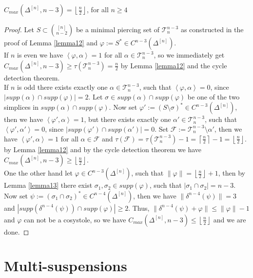 \begin{thm}
\(C_{max}(\Delta^{[n]},n-3)=\left\lfloor\frac{n}{2}\right\rfloor\), for all \(n\geq 4\)
\begin{proof}
Let \(S\subset\binom{[n]}{n-2}\) be a minimal piercing set of \(\mathcal{T}_n^{n-3}\) as constructed in the proof of Lemma \ref{lemma12} and \(\varphi:=S^*\in C^{n-3}(\Delta^{[n]})\).\\
If \(n\) is even we have \(\left\langle\varphi,\alpha\right\rangle=1\) for all \(\alpha\in\mathcal{T}_n^{n-3}\), so we immediately get \(C_{max}(\Delta^{[n]},n-3)\geq\tau(\mathcal{T}_n^{n-3})=\frac{n}{2}\) by Lemma \ref{lemma12} and the cycle detection theorem.\\
If \(n\) is odd there exists exactly one \(\alpha\in\mathcal{T}_n^{n-3}\), such that \(\left\langle\varphi,\alpha\right\rangle=0\), since \(\left|supp(\alpha)\cap supp(\varphi)\right|=2\). Let \(\sigma\in supp(\alpha)\cap supp(\varphi)\) be one of the two simplices in \(supp(\alpha)\cap supp(\varphi)\). Now set \(\varphi':=(S\setminus\sigma)^*\in C^{n-3}(\Delta^{[n]})\), then we have \(\left\langle\varphi',\alpha\right\rangle=1\), but there exists exactly one \(\alpha'\in\mathcal{T}_n^{n-3}\), such that \(\left\langle\varphi',\alpha'\right\rangle=0\), since \(\left|supp(\varphi')\cap supp(\alpha')\right|=0\). Set \(\mathcal{F}:=\mathcal{T}_n^{n-3}\setminus\alpha'\), then we have \(\left\langle\varphi',\alpha\right\rangle=1\) for all \(\alpha\in\mathcal{F}\) and \(\tau(\mathcal{F})=\tau(\mathcal{T}_n^{n-3})-1=\left\lceil\frac{n}{2}\right\rceil-1=\left\lfloor\frac{n}{2}\right\rfloor\). by Lemma \ref{lemma12} and by the cycle detection theorem we have \(C_{max}(\Delta^{[n]},n-3)\geq\left\lfloor\frac{n}{2}\right\rfloor\).\\
One the other hand let \(\varphi\in C^{n-3}(\Delta^{[n]})\), such that \(\|\varphi\|=\left\lfloor\frac{n}{2}\right\rfloor+1\), then by Lemma \ref{lemma13} there exist \(\sigma_1,\sigma_2\in supp(\varphi)\), such that \(\left|\sigma_1\cap\sigma_2\right|=n-3\). Now set \(\psi:=(\sigma_1\cap\sigma_2)^*\in C^{n-4}(\Delta^{[n]})\), then we have \(\|\delta^{n-4}(\psi)\|=3\) and \(\left|supp(\delta^{n-4}(\psi))\cap supp(\varphi)\right|\geq 2\). Thus, \(\|\delta^{n-4}(\psi)+\varphi\|\leq\|\varphi\|-1\) and \(\varphi\) can not be a cosystole, so we have \(C_{max}(\Delta^{[n]},n-3)\leq\left\lfloor\frac{n}{2}\right\rfloor\) and we are done.
\end{proof}
\end{thm}

\section{Multi-suspensions}

